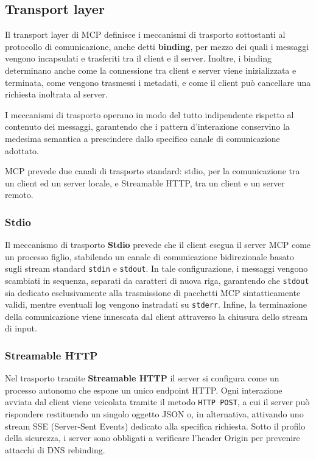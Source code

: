 \subsection{Transport layer}\label{transport-layer}

Il transport layer di MCP definisce i meccanismi di trasporto
sottostanti al protocollo di comunicazione, anche detti
\textbf{binding}, per mezzo dei quali i messaggi vengono incapsulati e
trasferiti tra il client e il server. Inoltre, i binding determinano
anche come la connessione tra client e server viene inizializzata e
terminata, come vengono trasmessi i metadati, e come il client può
cancellare una richiesta inoltrata al server.

I meccanismi di trasporto operano in modo del tutto indipendente
rispetto al contenuto dei messaggi, garantendo che i pattern
d'interazione conservino la medesima semantica a prescindere dallo
specifico canale di comunicazione adottato.

MCP prevede due canali di trasporto standard: stdio, per la
comunicazione tra un client ed un server locale, e Streamable HTTP, tra
un client e un server remoto.

\subsubsection{Stdio}\label{stdio}

Il meccanismo di trasporto \textbf{Stdio} prevede che il client esegua
il server MCP come un processo figlio, stabilendo un canale di
comunicazione bidirezionale basato sugli stream standard \texttt{stdin} e \texttt{stdout}.
In tale configurazione, i messaggi vengono scambiati in sequenza,
separati da caratteri di nuova riga, garantendo che \texttt{stdout} sia dedicato
esclusivamente alla trasmissione di pacchetti MCP sintatticamente
validi, mentre eventuali log vengono instradati su \texttt{stderr}. Infine, la
terminazione della comunicazione viene innescata dal client attraverso
la chiusura dello stream di input.

\subsubsection{Streamable HTTP}\label{streamable-http}

Nel trasporto tramite \textbf{Streamable HTTP} il server si configura
come un processo autonomo che espone un unico endpoint HTTP. Ogni
interazione avviata dal client viene veicolata tramite il metodo \texttt{HTTP
POST}, a cui il server può rispondere restituendo un singolo oggetto JSON
o, in alternativa, attivando uno stream SSE (Server-Sent Events)
dedicato alla specifica richiesta. Sotto il profilo della sicurezza, i
server sono obbligati a verificare l'header Origin per prevenire
attacchi di DNS rebinding.

